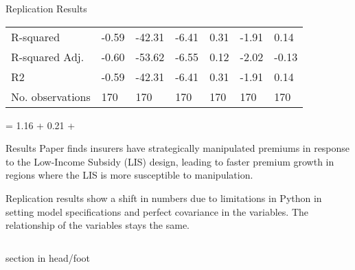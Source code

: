 \documentclass[final]{beamer}
\begin{document}
\begin{frame}[t]
\begin{columns}[T]
\begin{column}{.32\textwidth}
\begin{block}{\Huge Replication Results}
\begin{table}
\begin{center}
\begin{tabular}{lllllll}
R-squared                   & -0.59        & -42.31       & -6.41        & 0.31         & -1.91        & 0.14          \\
R-squared Adj.              & -0.60        & -53.62       & -6.55        & 0.12         & -2.02        & -0.13         \\
R2                          & -0.59        & -42.31       & -6.41        & 0.31         & -1.91        & 0.14          \\
No. observations            & 170          & 170          & 170          & 170          & 170          & 170           \\
\hline
\end{tabular}
\end{center}
\end{table}
\centering
\normalsize
{} = 1.16 + 0.21 + \epsilon
    \end{block}
        \begin{block}{\Huge Results} %
            \Large %
Paper finds insurers have strategically manipulated premiums in response to the Low-Income Subsidy (LIS) design, leading to faster premium growth in regions where the LIS is more susceptible to manipulation. \par
Replication results show a shift in numbers due to limitations in Python in setting model specifications and perfect covariance in the variables.  The relationship of the variables stays the same.

    
    \end{block}
\end{column}

\end{columns}
    \vspace{1cm} %
\begin{beamercolorbox}[center]{section in head/foot}
\end{beamercolorbox}

\end{frame}
\end{document}
